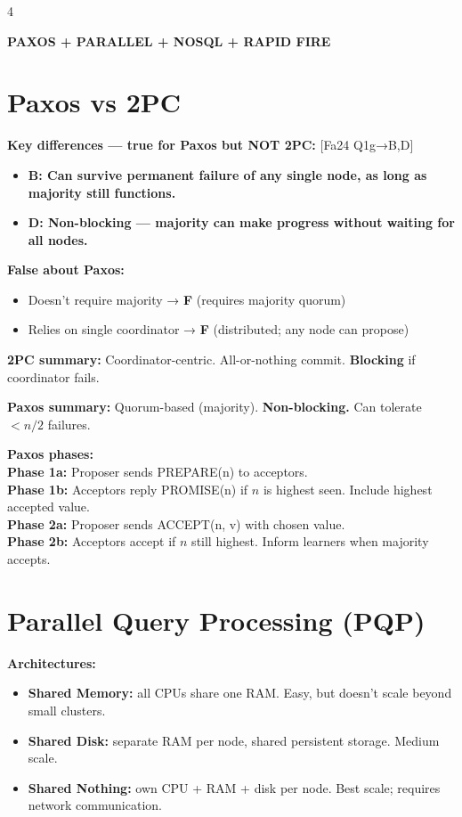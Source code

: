 \documentclass[8pt,letterpaper]{article}
\newcommand{\titlefont}{\fontsize{6.5}{7.5}\selectfont}
\newcommand{\key}[1]{\textbf{\color{red!70!black}#1}}
\newcommand{\ans}[1]{\textbf{\color{blue!80!black}#1}}
\newcommand{\qref}[1]{{\fontsize{3.5}{4}\selectfont\color{purple!60!black}[#1]}}
\begin{document}
\begin{multicols*}{4}
\centerline{\titlefont\textbf{\color{purple!80!black}PAXOS + PARALLEL + NOSQL + RAPID FIRE}}
\vspace{1pt}

\section{Paxos vs 2PC}
\key{Key differences — true for Paxos but NOT 2PC:} \qref{Fa24 Q1g→B,D}
\begin{itemize}
  \item \ans{B: Can survive permanent failure of any single node, as long as majority still functions.}
  \item \ans{D: Non-blocking — majority can make progress without waiting for all nodes.}
\end{itemize}

\key{False about Paxos:}
\begin{itemize}
  \item Doesn't require majority → \ans{F} (requires majority quorum)
  \item Relies on single coordinator → \ans{F} (distributed; any node can propose)
\end{itemize}

\key{2PC summary:} Coordinator-centric. All-or-nothing commit. \textbf{Blocking} if coordinator fails.

\key{Paxos summary:} Quorum-based (majority). \textbf{Non-blocking.} Can tolerate $< n/2$ failures.

\key{Paxos phases:}\\
\textbf{Phase 1a:} Proposer sends PREPARE(n) to acceptors.\\
\textbf{Phase 1b:} Acceptors reply PROMISE(n) if $n$ is highest seen. Include highest accepted value.\\
\textbf{Phase 2a:} Proposer sends ACCEPT(n, v) with chosen value.\\
\textbf{Phase 2b:} Acceptors accept if $n$ still highest. Inform learners when majority accepts.

\section{Parallel Query Processing (PQP)}
\key{Architectures:}
\begin{itemize}
  \item \textbf{Shared Memory:} all CPUs share one RAM. Easy, but doesn't scale beyond small clusters.
  \item \textbf{Shared Disk:} separate RAM per node, shared persistent storage. Medium scale.
  \item \textbf{Shared Nothing:} own CPU + RAM + disk per node. Best scale; requires network communication.
\end{itemize}


\end{multicols*}
\end{document}
